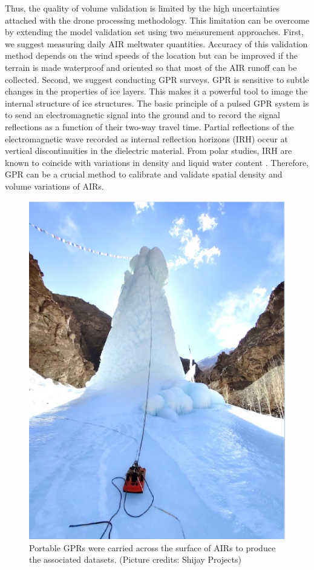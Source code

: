 Thus, the quality of volume validation is limited by the high uncertainties attached with the drone processing
methodology. This limitation can be overcome by extending the model validation set using two measurement
approaches. First, we suggest measuring daily AIR meltwater quantities. Accuracy of this validation method
depends on the wind speeds of the location but can be improved if the terrain is made waterproof and oriented so
that most of the AIR runoff can be collected. Second, we suggest conducting \ac{GPR} surveys. \ac{GPR} is
sensitive to subtle changes in the properties of ice layers. This makes it a powerful tool to image the internal
structure of ice structures. The basic principle of a pulsed \ac{GPR} system is to send an electromagnetic
signal into the ground and to record the signal reflections as a function of their two-way travel time. Partial
reflections of the electromagnetic wave recorded as internal reflection horizons (IRH) occur at vertical
discontinuities in the dielectric material. From polar studies, IRH are known to coincide with variations in
density and liquid water content \citep{forster2014extensive}. Therefore, \ac{GPR} can be a crucial method to
calibrate and validate spatial density and volume variations of \ac{AIRs}.


\begin{figure}[htb]
  \centering
	\includegraphics[width=8 cm]{figs/gpr_survey}
  \caption{Portable \ac{GPR}s were carried across the surface of \ac{AIRs} to produce the associated datasets. (Picture credits:
  Shijay Projects)}
	\label{fig:gpr_survey}
\end{figure}

